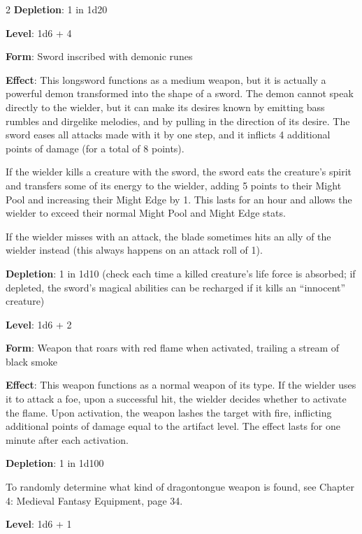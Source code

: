 \begin{multicols}{2}
\textbf{Depletion}: 1 in 1d20
	
% 


\textbf{Level}: 1d6 + 4 

\textbf{Form}: Sword inscribed with demonic runes 

\textbf{Effect}: This longsword functions as a medium weapon, but it is actually a powerful demon transformed into the shape of a sword. The demon cannot speak directly to the wielder, but it can make its desires known by emitting bass rumbles and dirgelike melodies, and by pulling in the direction of its desire. The sword eases all attacks made with it by one step, and it inflicts 4 additional points of damage (for a total of 8 points). 

If the wielder kills a creature with the sword, the sword eats the creature’s spirit and transfers some of its energy to the wielder, adding 5 points to their Might Pool and increasing their Might Edge by 1. This lasts for an hour and allows the wielder to exceed their normal Might Pool and Might Edge stats.

If the wielder misses with an attack, the blade sometimes hits an ally of the wielder instead (this always happens on an attack roll of 1). 

\textbf{Depletion}: 1 in 1d10 (check each time a killed creature’s life force is absorbed; if depleted, the sword’s magical abilities can be recharged if it kills an “innocent” creature) 


\textbf{Level}: 1d6 + 2 

\textbf{Form}: Weapon that roars with red flame when activated, trailing a stream of black smoke

\textbf{Effect}: This weapon functions as a normal weapon of its type. If the wielder uses it to attack a foe, upon a successful hit, the wielder decides whether to activate the flame. Upon activation, the weapon lashes the target with fire, inflicting additional points of damage equal to the artifact level. The effect lasts for one minute after each activation. 

\textbf{Depletion}: 1 in 1d100

To randomly determine what kind of dragontongue weapon is found, see Chapter 4: Medieval Fantasy Equipment, page 34.


\textbf{Level}: 1d6 + 1 


\end{multicols}
